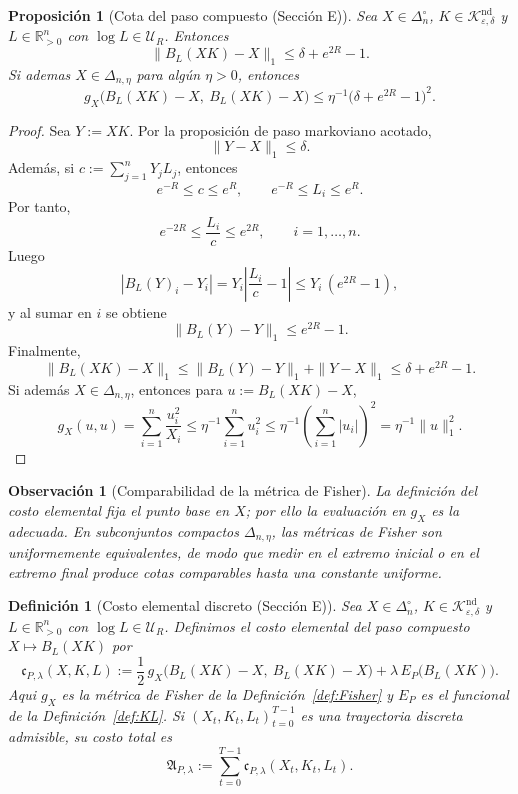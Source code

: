 ﻿\documentclass[12pt]{article}
\newcommand{\fuente}[1]{\textnormal{(#1)}}
\newtheorem{definicion}{Definición}[section]
\newtheorem{proposicion}{Proposición}[section]
\newtheorem{observacion}{Observación}[section]
\begin{document}
\begin{proposicion}[Cota del paso compuesto \fuente{Sección E}]
Sea \(X\in\Delta_n^\circ\), \(K\in\mathcal K_{\varepsilon,\delta}^{\mathrm{nd}}\) y \(L\in\mathbb R_{>0}^n\) con \(\log L\in\mathcal U_R\). Entonces
\[
\|B_L(XK)-X\|_1\le \delta + e^{2R}-1.
\]
Si ademas \(X\in\Delta_{n,\eta}\) para algún \(\eta>0\), entonces
\[
g_X\bigl(B_L(XK)-X,\ B_L(XK)-X\bigr)\le \eta^{-1}\bigl(\delta + e^{2R}-1\bigr)^2.
\]
\end{proposicion}
\begin{proof}
Sea \(Y:=XK\). Por la proposición de paso markoviano acotado,
\[
\|Y-X\|_1\le \delta.
\]
Además, si \(c:=\sum_{j=1}^n Y_jL_j\), entonces
\[
e^{-R}\le c\le e^R,
\qquad
e^{-R}\le L_i\le e^R.
\]
Por tanto,
\[
e^{-2R}\le \frac{L_i}{c}\le e^{2R},
\qquad i=1,\dots,n.
\]
Luego
\[
|B_L(Y)_i-Y_i|
=Y_i\left|\frac{L_i}{c}-1\right|
\le Y_i\,(e^{2R}-1),
\]
y al sumar en \(i\) se obtiene
\[
\|B_L(Y)-Y\|_1\le e^{2R}-1.
\]
Finalmente,
\[
\|B_L(XK)-X\|_1
\le \|B_L(Y)-Y\|_1+\|Y-X\|_1
\le \delta+e^{2R}-1.
\]
Si además \(X\in\Delta_{n,\eta}\), entonces para \(u:=B_L(XK)-X\),
\[
g_X(u,u)=\sum_{i=1}^n \frac{u_i^2}{X_i}
\le \eta^{-1}\sum_{i=1}^n u_i^2
\le \eta^{-1}\left(\sum_{i=1}^n |u_i|\right)^2
=\eta^{-1}\|u\|_1^2.
\]
\end{proof}

\begin{observacion}[Comparabilidad de la métrica de Fisher]
La definición del costo elemental fija el punto base en \(X\); por ello la evaluación en \(g_X\) es la adecuada. En subconjuntos compactos \(\Delta_{n,\eta}\), las métricas de Fisher son uniformemente equivalentes, de modo que medir en el extremo inicial o en el extremo final produce cotas comparables hasta una constante uniforme.
\end{observacion}
\begin{definicion}[Costo elemental discreto \fuente{Sección E}]
Sea \(X\in\Delta_n^\circ\), \(K\in\mathcal K_{\varepsilon,\delta}^{\mathrm{nd}}\) y \(L\in\mathbb R_{>0}^n\) con \(\log L\in\mathcal U_R\). Definimos el costo elemental del paso compuesto \(X\mapsto B_L(XK)\) por
\[
\mathfrak c_{P,\lambda}(X,K,L):=\frac12\,g_X\bigl(B_L(XK)-X,\ B_L(XK)-X\bigr)+\lambda\,E_P\bigl(B_L(XK)\bigr).
\]
Aqui \(g_X\) es la métrica de Fisher de la Definición~\ref{def:Fisher} y \(E_P\) es el funcional de la Definición~\ref{def:KL}.
Si \((X_t,K_t,L_t)_{t=0}^{T-1}\) es una trayectoria discreta admisible, su costo total es
\[
\mathfrak A_{P,\lambda}:=\sum_{t=0}^{T-1}\mathfrak c_{P,\lambda}(X_t,K_t,L_t).
\]
\end{definicion}
\end{document}
